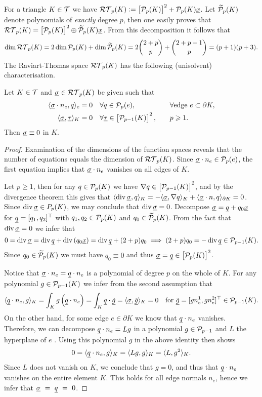 \documentclass[thesis.tex]{subfiles}
\begin{document}
For a triangle $K \in  \T$ we have $\RT_p(K) := \left[ \P_p(K)\right]^2 + \P_p(K)\v{x}$.
Let $\wt \P_p(K)$ denote polynomials of \emph{exactly} degree $p$, then one easily proves that
${\RT_p(K) = \left [\P_p(K)\right]^2 \oplus \wt \P_p(K) \v{x}}$.
From this decomposition it follows that
\[
  \dim{\RT_p(K)} = 2 \dim{\P_p(K)}+ \dim{\wt \P_p(K)} = 2 {2 + p \choose p} + {2 + p - 1 \choose p} = (p+1)(p+3).
\]
The Raviart-Thomas space $\RT_p(K)$ has  the following (unisolvent) characterisation.
\begin{thm}
  \label{thm:rtunisol}
  Let $K \in  \T$ and $\vsig \in \RT_p(K)$ be given such that
  \begin{alignat*}{2}
    \ip{\vsig \cdot n_e, q}_e &= 0 \quad \forall q \in \P_p(e), &&\quad \forall \text{edge } e \subset \partial K,\\
    \ip{\vsig, \vtau}_K &= 0 \quad \forall \vtau \in \left[\P_{p-1}(K)\right]^2, &&\quad p \geq 1.
  \end{alignat*}
  Then $\vsig \equiv 0$ in $K$.
\end{thm}
\begin{proof}
  Examination of the dimensions of the function spaces reveals that the number of equations equals the dimension of $\RT_p(K)$.
  Since $\vsig \cdot n_e \in \P_p(e)$, the first equation implies that $\vsig \cdot n_e$ vanishes on all edges of $K$.

  Let $p \geq 1$, then for any $q \in \P_p(K)$ we have $\nabla q \in \left[\P_{p-1}(K)\right]^2$, and by the divergence theorem this gives that
  $\ip{\div \vsig, q}_K = - \ip{\vsig, \nabla q}_K + \ip{\vsig \cdot n, q}_{\partial K} = 0$. Since $\div \vsig \in P_p(K)$, we
  may conclude that $\div \vsig = 0$.  Decompose $\vsig = \v{q} + q_0\v{x}$ for $\v{q} = [q_1, q_2]^\top$ with $q_1, q_2  \in\P_p(K)$ and $q_0 \in  \wt \P_p(K)$. From the fact that $\div \vsig =0$ we infer that
  \[
    0 = \div \vsig = \div \v{q} + \div \left(q_0 \v{x}\right) = \div \v{q} + (2 + p) q_0 \implies (2 + p) q_0 = - \div \v{q} \in \P_{p-1}(K).
  \]
  Since $q_0 \in \wt \P_p(K)$ we must have $q_0 \equiv 0$ and thus $\vsig = \v{q} \in \left[\P_{p}(K)\right]^2$.

  Notice that $\vsig \cdot n_e = \v{q} \cdot n_e$ is a polynomial of degree $p$  on the whole of $K$.
  For any polynomial $g \in \P_{p-1}(K)$ we infer from the second assumption that
  \[
    \ip{\v{q} \cdot n_e, g}_K = \int_K g \left(\v{q} \cdot n_e\right) = \int_K \v{q} \cdot \v{\tilde g} = \ip{\vsig, \v{\tilde g}}_K = 0 \quad \text{for } \v{\tilde g} = [g n_e^1, gn_e^2]^\top \in \P_{p-1}(K).
  \]
  On the other hand, for some edge $e \in \partial K$ we know that  $\v{q} \cdot n_e$ vanishes.
  Therefore, we can decompose $\v{q}\cdot n_e = Lg$ in a polynomial $g \in \P_{p-1}$ and $L$ the hyperplane of $e$ \cite[Lem~3.1.10]{brenner}. Using this polynomial $g$ in the above identity then shows
  \[
    0 = \ip{\v{q}\cdot n_e, g}_K = \ip{Lg, g}_K = \ip{L,g^2}_K.
  \]
  Since $L$ does not vanish on $K$, we conclude that $g = 0$, and thus that $\v{q}\cdot n_e$ vanishes
  on the entire element $K$. This holds for all edge  normals $n_e$,  hence we infer that $\vsig~=~\v{q}~=~0$.
\end{proof}
\end{document}
